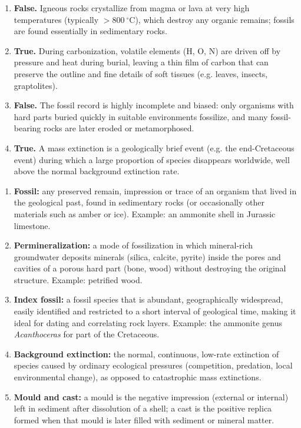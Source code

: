 \documentclass[11pt]{article}
\begin{document}
\begin{corrige}
\begin{enumerate}
\item \textbf{False.} Igneous rocks crystallize from magma or lava at very high temperatures (typically $>800\ ^\circ\mathrm{C}$), which destroy any organic remains; fossils are found essentially in sedimentary rocks.
\item \textbf{True.} During carbonization, volatile elements (H, O, N) are driven off by pressure and heat during burial, leaving a thin film of carbon that can preserve the outline and fine details of soft tissues (e.g. leaves, insects, graptolites).
\item \textbf{False.} The fossil record is highly incomplete and biased: only organisms with hard parts buried quickly in suitable environments fossilize, and many fossil-bearing rocks are later eroded or metamorphosed.
\item \textbf{True.} A mass extinction is a geologically brief event (e.g. the end-Cretaceous event) during which a large proportion of species disappears worldwide, well above the normal background extinction rate.
\end{enumerate}
\end{corrige}

\begin{corrige}
\begin{enumerate}
\item \textbf{Fossil:} any preserved remain, impression or trace of an organism that lived in the geological past, found in sedimentary rocks (or occasionally other materials such as amber or ice). Example: an ammonite shell in Jurassic limestone.
\item \textbf{Permineralization:} a mode of fossilization in which mineral-rich groundwater deposits minerals (silica, calcite, pyrite) inside the pores and cavities of a porous hard part (bone, wood) without destroying the original structure. Example: petrified wood.
\item \textbf{Index fossil:} a fossil species that is abundant, geographically widespread, easily identified and restricted to a short interval of geological time, making it ideal for dating and correlating rock layers. Example: the ammonite genus \emph{Acanthoceras} for part of the Cretaceous.
\item \textbf{Background extinction:} the normal, continuous, low-rate extinction of species caused by ordinary ecological pressures (competition, predation, local environmental change), as opposed to catastrophic mass extinctions.
\item \textbf{Mould and cast:} a mould is the negative impression (external or internal) left in sediment after dissolution of a shell; a cast is the positive replica formed when that mould is later filled with sediment or mineral matter.
\end{enumerate}
\end{corrige}
\end{document}
